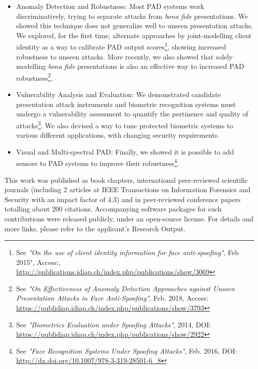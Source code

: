 \documentclass[a4paper,10pt,onecolumn]{article}
\begin{document}
\begin{itemize}

  \item Anomaly Detection and Robustness: Most PAD systems work
    discriminatively, trying to separate attacks from \textit{bona fide}
    presentations.  We showed this technique does not generalize well to unseen
    presentation attacks.  We explored, for the first time, alternate
    approaches by joint-modelling client identity as a way to calibrate PAD
    output scores\footnote{See \textit{"On the use of client identity
    information for face anti-spoofing"}, Feb 2015", Access:,
    \url{http://publications.idiap.ch/index.php/publications/show/3069}},
    showing increased robustness to unseen attacks.  More recently, we also
    showed that solely modelling \textit{bona fide} presentations is also an
    effective way to increased PAD robustness\footnote{See \textit{"On
    Effectiveness of Anomaly Detection Approaches against Unseen Presentation
    Attacks in Face Anti-Spoofing"}, Feb. 2018, Access:
    \url{https://publidiap.idiap.ch/index.php/publications/show/3793}}.

  \item Vulnerability Analysis and Evaluation: We demonstrated candidate
    presentation attack instruments and biometric recognition systems must
    undergo a vulnerability assessment to quantify the pertinence and quality
    of attacks\footnote{See \textit{"Biometrics Evaluation under Spoofing
    Attacks"}, 2014, DOI:
    \url{https://publidiap.idiap.ch/index.php/publications/show/2922}}.  We
    also devised a way to tune protected biometric systems to various different
    applications, with changing security requirements.

  \item Visual and Multi-spectral PAD: Finally, we showed it is possible to
    add sensors to PAD systems to improve their robustness\footnote{See
    \textit{"Face Recognition Systems Under Spoofing Attacks"}, Feb. 2016, DOI:
    \url{http://dx.doi.org/10.1007/978-3-319-28501-6_8}}.

\end{itemize}

This work was published as book chapters, international peer-reviewed
scientific journals (including 2 articles at IEEE Transactions on Information
Forensics and Security with an impact factor of 4.3) and in peer-reviewed
conference papers totalling about 200 citations.  Accompanying software
packages for such contributions were released publicly, under an open-source
license. For details and more links, please refer to the applicant's Research
Output.
\end{document}
